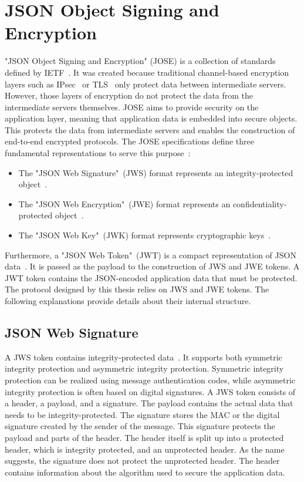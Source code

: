 \documentclass[../main.tex]{subfiles}
\begin{document}
\section{JSON Object Signing and Encryption}
\label{sec:jose}
"JSON Object Signing and Encryption" (JOSE) is a collection of standards defined by IETF~\cite{Barnes2014}.
It was created because traditional channel-based encryption layers such as IPsec~\cite{IPSEC2011} or TLS~\cite{TLS2018} only protect data between intermediate servers.
However, those layers of encryption do not protect the data from the intermediate servers themselves.
JOSE aims to provide security on the application layer, meaning that application data is embedded into secure objects.
This protects the data from intermediate servers and enables the construction of end-to-end encrypted protocols.
The JOSE specifications define three fundamental representations to serve this purpose~\cite{Barnes2014}:
\begin{itemize}
    \item The "JSON Web Signature"~(JWS) format represents an integrity-protected object~\cite{JWS2015}.
    \item The "JSON Web Encryption"~(JWE) format represents an confidentiality-protected object~\cite{JWE2015}.
    \item The "JSON Web Key"~(JWK) format represents cryptographic keys~\cite{JWK2015}.
\end{itemize}
Furthermore, a "JSON Web Token"~(JWT) is a compact representation of JSON data~\cite{JWT2015}.
It is passed as the payload to the construction of JWS and JWE tokens.
A JWT token contains the JSON-encoded application data that must be protected.
The protocol designed by this thesis relies on JWS and JWE tokens.
The following explanations provide details about their internal structure.

\subsection{JSON Web Signature}
A JWS token contains integrity-protected data~\cite{JWS2015}.
It supports both symmetric integrity protection and asymmetric integrity protection.
Symmetric integrity protection can be realized using message authentication codes, while asymmetric integrity protection is often based on digital signatures.
A JWS token consists of a header, a payload, and a signature.
The payload contains the actual data that needs to be integrity-protected.
The signature stores the MAC or the digital signature created by the sender of the message.
This signature protects the payload and parts of the header.
The header itself is split up into a protected header, which is integrity protected, and an unprotected header.
As the name suggests, the signature does not protect the unprotected header.
The header contains information about the algorithm used to secure the application data.
\end{document}
